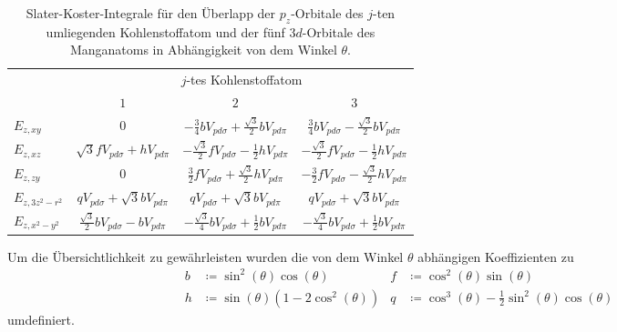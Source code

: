 \begin{table}
    \centering
    \caption{Slater-Koster-Integrale für den Überlapp der $p_z$-Orbitale des $j$-ten umliegenden
    Kohlenstoffatom und der fünf $3d$-Orbitale des Manganatoms in Abhängigkeit von dem Winkel $\theta$.}
    \label{tab:slaterkosters}
    \begin{tabular}{l c c c}
    & \multicolumn{3}{c}{$j$-tes Kohlenstoffatom}\\
    \cmidrule(lr){2-4}
    & {$1$} & {$2$} & {$3$} \\
    \midrule
    {$E_{z,xy}$      }  & {$0$}                                               & {$-\frac{3}{4}bV_{pd\sigma} + \frac{\sqrt{3}}{2}bV_{pd\pi}$}          & {$ \frac{3}{4}bV_{pd\sigma}-\frac{\sqrt{3}}{2}bV_{pd\pi}$}         \vspace{0.5cm} \\ 
    {$E_{z,xz}$      }  & {$\sqrt{3}fV_{pd\sigma} + hV_{pd\pi}$}              & {$-\frac{\sqrt{3}}{2}fV_{pd\sigma} - \frac{1}{2} hV_{pd\pi}$}         & {$-\frac{\sqrt{3}}{2}fV_{pd\sigma} - \frac{1}{2} hV_{pd\pi}$}      \vspace{0.5cm} \\
    {$E_{z,zy}$      }  & {$0$}                                               & {$ \frac{3}{2}fV_{pd\sigma}+\frac{\sqrt{3}}{2} hV_{pd\pi}$}           & {$-\frac{3}{2}fV_{pd\sigma}-\frac{\sqrt{3}}{2} hV_{pd\pi}$}        \vspace{0.5cm} \\
    {$E_{z,3z^2-r^2}$}  & {$q V_{pd\sigma}+\sqrt{3}bV_{pd\pi}$}               & {$q V_{pd\sigma}+\sqrt{3}bV_{pd\pi}$}                                 & {$q V_{pd\sigma}+\sqrt{3}bV_{pd\pi}$} \vspace{0.5cm} \\
    {$E_{z,x^2-y^2}$ }  & {$\frac{\sqrt{3}}{2}bV_{pd\sigma}-bV_{pd\pi}$}      & {$-\frac{\sqrt{3}}{4}bV_{pd\sigma}+\frac{1}{2}bV_{pd\pi}$}           & {$-\frac{\sqrt{3}}{4}bV_{pd\sigma}+\frac{1}{2}bV_{pd\pi}$}                       \\ 
    \bottomrule
    \end{tabular}
  \end{table}
Um die Übersichtlichkeit zu gewährleisten wurden die von dem Winkel $\theta$ abhängigen Koeffizienten zu
\begin{align*}
b & \coloneq \sin^2(\theta) \cos(\theta)        & f &  \coloneq \cos^2(\theta) \sin(\theta)                             \\                     
h & \coloneq \sin(\theta)(1-2\cos^2(\theta))    & q &  \coloneq \cos^3(\theta) - \frac{1}{2}\sin^2(\theta) \cos(\theta)
\end{align*}
umdefiniert.
